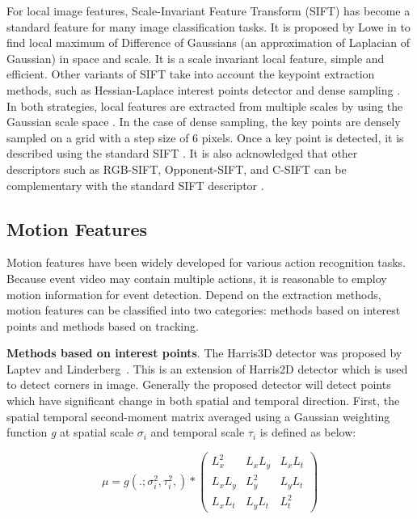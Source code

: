 For local image features, Scale-Invariant Feature Transform (SIFT) has become a standard feature for many image classification tasks. It is proposed by Lowe in \cite{Lowe:2004} to find local maximum of Difference of Gaussians (an approximation of Laplacian of Gaussian) in space and scale. It is a scale invariant local feature, simple and efficient. Other variants of SIFT take into account the keypoint extraction methods, such as Hessian-Laplace interest points detector \cite{mikolajczyk2002affine} and dense sampling \cite{nowak2006sampling}. In both strategies, local features are extracted from multiple scales by using the Gaussian scale space \cite{mikolajczyk2002affine}. In the case of dense sampling, the key points are densely sampled on a grid with a step size of 6 pixels. Once a key point is detected, it is described using the standard SIFT \cite{Lowe:2004}. It is also acknowledged that other descriptors such as RGB-SIFT, Opponent-SIFT, and C-SIFT \cite{burghouts2009performance} can be complementary with the standard SIFT descriptor \cite{yu2014informedia}.

\subsection{Motion Features}
Motion features have been widely developed for various action recognition tasks. Because event video may contain multiple actions, it is reasonable to employ motion information for event detection. Depend on the extraction methods, motion features can be classified into two categories: methods based on interest points and methods based on tracking. 


\textbf{Methods based on interest points}. The Harris3D detector was proposed by Laptev and Linderberg~\cite{Laptev03space-timeinterest}. This is an extension of Harris2D detector which is used to detect corners in image. Generally the proposed detector will detect points which have significant change in both spatial and temporal direction. First, the spatial temporal second-moment matrix averaged using a Gaussian weighting function \textit{g} at spatial scale $\sigma_{i}$ and temporal scale $\tau_{i}$ is defined as below:

\begin{equation}
	\mu = g(.; \sigma_{i}^{2},\tau_{i}^{2},)* \left( \begin{array}{ccc}L_{x}^{2} & L_{x}L_{y} & L_{x}L_{t} 
		\\L_{x}L_{y} & L_{y}^{2} & L_{y}L_{t} \\ L_{x}L_{t} & L_{y}L_{t} & L_{t}^{2}\end{array} \right)
\end{equation}

